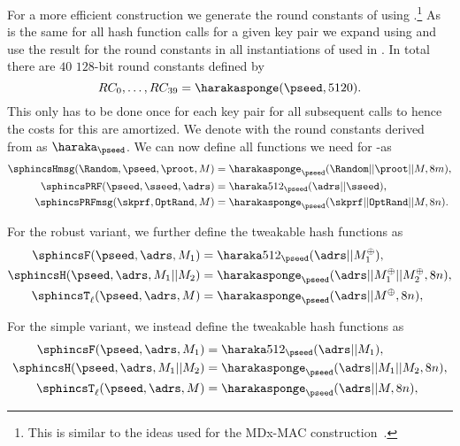    For a more efficient construction we generate the round constants of 
   \haraka using \pseed.\footnote{This is similar to the ideas used for the 
   MDx-MAC construction~\cite{DBLP:conf/crypto/PrenelO95}.} As \pseed is the 
   same for all hash function calls for a given key pair we expand \pseed 
   using \harakasponge and use the result for the round constants in all 
   instantiations of \haraka used in \spx. In total there are $40$ $128$-bit
   round constants defined by
   \begin{equation}
      RC_0,\ldots,RC_{39} = \harakasponge(\pseed, 5120).
   \end{equation}
   This only has to be done once for each key pair for all subsequent calls 
   to \haraka hence the costs for this are amortized. We denote \haraka with 
   the round constants derived from \pseed as $\haraka_{\pseed}$. We can now define 
   all functions we need for \spx-\haraka as
   \begin{equation}
   \begin{aligned}
      \sphincsHmsg(\Random,\pseed, \proot, M) &= \harakasponge_{\pseed}(\Random || \proot || M, 8m),\\
      \sphincsPRF(\pseed, \sseed, \adrs) &= \haraka512_{\pseed}(\adrs || \sseed),\\
      \sphincsPRFmsg(\skprf, \texttt{OptRand}, M) &= \harakasponge_{\pseed}(\skprf || \texttt{OptRand} || M, 8n).\\
   \end{aligned}
   \end{equation}

   For the robust variant, we further define the tweakable hash functions as
   \begin{equation}
   \begin{aligned}
      \sphincsF(\pseed, \adrs, M_1) &= \haraka512_{\pseed}(\adrs || M_1^{\oplus}),\\
      \sphincsH(\pseed, \adrs, M_1 || M_2) &=  \harakasponge_{\pseed}(\adrs || 
                                           M_1^{\oplus} || M_2^{\oplus}, 8n),\\
      \sphincsT_\ell(\pseed, \adrs, M) &=  \harakasponge_{\pseed}(\adrs || M^{\oplus}, 8n),\\
   \end{aligned}
   \end{equation}

   For the simple variant, we instead define the tweakable hash functions as
   \begin{equation}
   \begin{aligned}
      \sphincsF(\pseed, \adrs, M_1) &= \haraka512_{\pseed}(\adrs || M_1),\\
      \sphincsH(\pseed, \adrs, M_1 || M_2) &=  \harakasponge_{\pseed}(\adrs || 
                                           M_1 || M_2, 8n),\\
      \sphincsT_\ell(\pseed, \adrs, M) &=  \harakasponge_{\pseed}(\adrs || M, 8n),\\
   \end{aligned}
   \end{equation}


